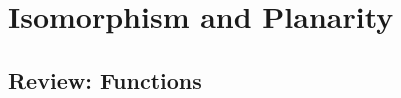 
\newcommand{\laClass}       {CS 211}
\newcommand{\laSemester}    {Spring 2018}
\newcommand{\laChapter}     {7.3}
\newcommand{\laType}        {Exercise}
\newcommand{\laPoints}      {5}
\newcommand{\laTitle}       {Isomorphism and Planarity}
\newcommand{\laDate}        {}
\setcounter{chapter}{7}
\setcounter{section}{3}
\addtocounter{section}{-1}

\toggletrue{answerkey}
\togglefalse{answerkey}





    \section{\laTitle}

    \subsection{Review: Functions}

